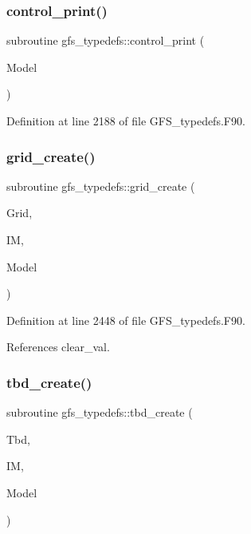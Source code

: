 \subsubsection{control\+\_\+print()}
{\footnotesize\ttfamily subroutine gfs\+\_\+typedefs\+::control\+\_\+print (\begin{DoxyParamCaption}\item[{class(\textbf{ gfs\+\_\+control\+\_\+type})}]{Model }\end{DoxyParamCaption})}



Definition at line 2188 of file G\+F\+S\+\_\+typedefs.\+F90.

\mbox{\label{namespacegfs__typedefs_a10c12a1480adeaa94ebaa6f83bf79ce3}} 
\subsubsection{grid\+\_\+create()}
{\footnotesize\ttfamily subroutine gfs\+\_\+typedefs\+::grid\+\_\+create (\begin{DoxyParamCaption}\item[{class(\textbf{ gfs\+\_\+grid\+\_\+type})}]{Grid,  }\item[{integer, intent(in)}]{IM,  }\item[{type(\textbf{ gfs\+\_\+control\+\_\+type}), intent(in)}]{Model }\end{DoxyParamCaption})}



Definition at line 2448 of file G\+F\+S\+\_\+typedefs.\+F90.



References clear\+\_\+val.

\mbox{\label{namespacegfs__typedefs_a3eb837b3572ec102f6b1aaeb0aadd23e}} 
\subsubsection{tbd\+\_\+create()}
{\footnotesize\ttfamily subroutine gfs\+\_\+typedefs\+::tbd\+\_\+create (\begin{DoxyParamCaption}\item[{class(\textbf{ gfs\+\_\+tbd\+\_\+type})}]{Tbd,  }\item[{integer, intent(in)}]{IM,  }\item[{type(\textbf{ gfs\+\_\+control\+\_\+type}), intent(in)}]{Model }\end{DoxyParamCaption})}



